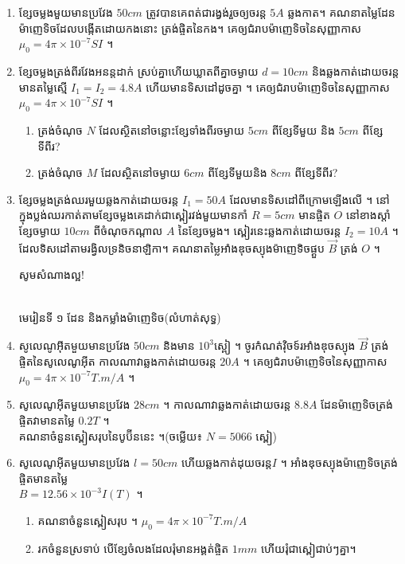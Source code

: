 \documentclass[12pt, a4paper]{article}
\begin{document}
\begin{enumerate}[m]
	\item ខ្សែចម្លងមួយមានប្រវែង $50cm$ ត្រូវបានគេពត់ជារង្វង់រួចឲ្យចរន្ត $5A$ ឆ្លងកាត។ គណនាតម្លៃដែនម៉ាញេទិចដែលបង្កើតដោយកងនោះ ត្រង់ផ្ចិតនៃកង។ គេឲ្យជំរាបម៉ាញេទិចនៃសុញ្ញាកាស $\mu_0=4\pi\times10^{-7}SI$ ។ 
	\item ខ្សែចម្លងត្រង់ពីរវែងអនន្តដាក់ ស្រប់គ្នាហើយឃ្លាតពីគ្នាចម្ងាយ $d=10cm$ និងឆ្លងកាត់ដោយចរន្តមានតម្លៃស្មើ $I_1=I_2=4.8A$ ហើយមានទិសដៅដូចគ្នា ។ គេឲ្យជំរាបម៉ាញេទិចនៃសុញ្ញាកាស $\mu_0=4\pi\times10^{-7}SI$ ។
	\begin{enumerate}[k]
		\item ត្រង់ចំណុច $N$ ដែលស្ថិតនៅចន្លោះខ្សែទាំងពីរចម្ងាយ $5cm$ ពីខ្សែទីមួយ និង $5cm$ ពីខ្សែទីពីរ?
		\item ត្រង់ចំណុច $M$ ដែលស្ថិតនៅចម្ងាយ $6cm$ ពីខ្សែទីមួយនិង $8cm$ ពីខ្សែទីពីរ?
	\end{enumerate}
	\item ខ្សែចម្លងត្រង់ឈរមួយឆ្លងកាត់ដោយចរន្ត $I_1=50A$ ដែលមានទិសដៅពីក្រោមឡើងលើ ។ នៅក្នុងប្លង់ឈរកាត់តាមខ្សែចម្លងគេដាក់ជាស្ពៀរវង់មួយមានកាំ $R=5cm$ មានផ្ចិត $O$ នៅខាងស្តាំខ្សែចម្ងាយ $10cm$ ពីចំណុចកណ្តាល $A$ នៃខ្សែចម្លង។ ស្ពៀរនេះឆ្លងកាត់ដោយចរន្ត $I_2=10A$ ។ ដែលទិសដៅតាមរង្វិលទ្រនិចនាឡិកា។ គណនាតម្លៃអាំងឌុចស្យុងម៉ាញេទិចផ្គួប $\vec{B}$ ត្រង់ $O$ ។
		\begin{center}
			\sffamily\color{black}
			សូមសំណាងល្អ!
		\end{center}
	\begin{center}
	\sffamily\color{black}
	\\
		មេរៀនទី​ ១ ដែន និងកម្លាំងម៉ាញេទិច(លំហាត់សុទ្ធ)
	\end{center}
	\item សូលេណូអ៊ីតមួយមានប្រវែង $50cm$ និងមាន $10^{3}$ស្ពៀ ។ ចូរកំណត់វ៉ិចទ៍រអាំងឌុចស្យុង $\vec{B}$ ត្រង់ផ្ចិតនៃសូលេណូអ៊ីត កាលណាវាឆ្លងកាត់ដោយចរន្ត $20A$ ។ គេឲ្យជំរាបម៉ាញេទិចនៃសុញ្ញាកាស $\mu_0=4\pi\times10^{-7}T.m/A$ ។
	\item សូលេណូអ៊ីតមួយមានប្រវែង $28cm$ ។ កាលណាវាឆ្លងកាត់ដោយចរន្ត $8.8A$ ដែនម៉ាញេទិចត្រង់ផ្ចិតវាមានតម្លៃ $0.2T$ ។\\
	គណនាចំនួនស្ពៀសរុបនៃបូប៊ីននេះ ។(ចម្លើយ៖ $N=5066$ ស្ពៀ)
	\item សូលេណូអ៊ីតមួយមានប្រវែង $l=50cm$ ហើយឆ្លងកាត់ដុយចរន្ត$I$ ។ អាំងឌុចស្យុងម៉ាញេទិចត្រង់ផ្ចិតមានតម្លៃ \\$B=12.56\times10^{-3}I(T)$ ។
	\begin{enumerate}[k]
		\item គណនាចំនួនស្ពៀសរុប ។ $\mu_0=4\pi\times10^{-7}T.m/A$ 
		\item រកចំនួនស្រទាប់ បើខ្សែចំលងដែលរុំមានអង្គត់ផ្ចិត $1mm$ ហើយរុំជាស្ពៀជាប់ៗគ្នា។

\end{enumerate}
\end{enumerate}
\end{document}
